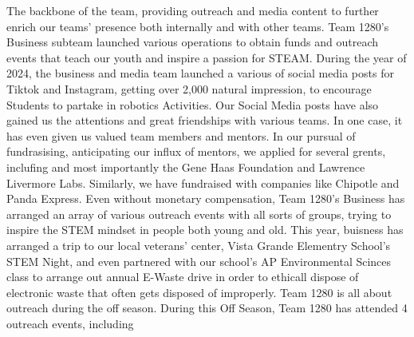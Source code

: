 The backbone of the team, providing outreach and media content to further enrich our teams' presence both internally and with other teams. Team 1280's Business subteam launched various operations to obtain funds and outreach events that teach our youth and inspire a passion for STEAM. 
During the year of 2024, the business and media team launched a various of social media posts for Tiktok and Instagram, getting over 2,000 natural impression, to encourage Students to partake in robotics Activities. Our Social Media posts have also gained us the attentions and great friendships with various teams. In one case, it has even given us valued team members and mentors. In our pursual of fundrasising, anticipating our influx of mentors, we applied for several grents, inclufing and most importantly the Gene Haas Foundation and Lawrence Livermore Labs. Similarly, we have fundraised with companies like Chipotle and Panda Express. Even without monetary compensation, Team 1280's Business has arranged an array of various outreach events with all sorts of groups, trying to inspire the STEM mindset in people both young and old. This year, buisness has arranged a trip to our local veterans' center, Vista Grande Elementry School's STEM Night, and even partnered with our school's AP Environmental Scinces class to arrange out annual E-Waste drive in order to ethicall dispose of electronic waste that often gets disposed of improperly.  
Team 1280 is all about outreach during the off season. During this Off Season, Team 1280 has attended 4 outreach events, including 
